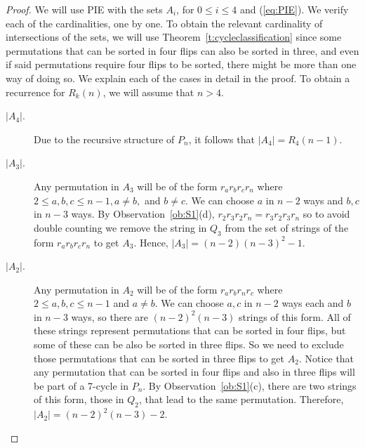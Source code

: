 \documentclass[final]{dmtcs-episciences}
\numberwithin{equation}{section}
\begin{document}
\begin{proof} We will use PIE with the sets $A_i$, for $0\leq i\leq 4$ and (\ref{eq:PIE}). We verify each of the cardinalities, one by one. To obtain the relevant cardinality of intersections of the sets, we will use Theorem~\ref{t:cycleclassification} since some permutations that can be sorted in four flips can also be sorted in three, and even if said permutations require four flips to be sorted, there might be more than one way of doing so. We explain each of the cases in detail in the proof. To obtain a recurrence for $R_k(n)$, we will assume that $n>4$. 
\begin{description}
\item[$|A_4|$.] Due to the recursive structure of $P_n$, it follows that $|A_4| = R_4(n-1)$.
\item[$|A_3|$.] Any permutation in $A_3$ will be of the form $r_a r_b r_c r_n$ where $2 \leq a,b,c \leq n-1, a \neq b,$ and $b\neq c$. We can choose $a$ in $n-2$ ways and $b,c$ in $n-3$ ways. By Observation~\ref{ob:S1}(d), $r_2r_3r_2r_n=r_3r_2r_3r_n$ so to avoid double counting we remove the string in $Q_3$ from the set of strings of the form $r_a r_b r_c r_n$ to get $A_3$. Hence, $|A_3|=(n-2)(n-3)^2-1$.
\item[$|A_2|$.] Any permutation in $A_2$ will be of the form $r_a r_b r_n r_c$ where $2 \leq a,b,c \leq n-1$ and $a\neq b$. We can choose $a,c$ in $n-2$ ways each and $b$ in $n-3$ ways, so there are $(n-2)^2(n-3)$ strings of this form. All of these strings represent permutations that can be sorted in four flips, but some of these can be also be sorted in three flips. So we need to exclude those permutations that can be sorted in three flips to get $A_2$. Notice that any permutation that can be sorted in four flips and also in three flips will be part of a 7-cycle in $P_n$. By Observation~\ref{ob:S1}(c), there are two strings of this form, those in $Q_2$, that lead to the same permutation. Therefore, $|A_2| = (n-2)^2(n-3) - 2$.

\end{description}
\end{proof}
\end{document}
